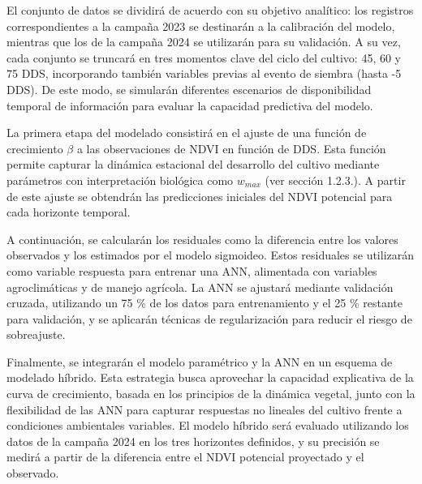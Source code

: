 \documentclass[
11pt, %
]{charter}
\begin{document}
El conjunto de datos se dividirá de acuerdo con su objetivo analítico: los registros correspondientes a la campaña 2023 se destinarán a la calibración del modelo, mientras que los de la campaña 2024 se utilizarán para su validación. A su vez, cada conjunto se truncará en tres momentos clave del ciclo del cultivo: 45, 60 y 75 DDS, incorporando también variables previas al evento de siembra (hasta -5 DDS). De este modo, se simularán diferentes escenarios de disponibilidad temporal de información para evaluar la capacidad predictiva del modelo.

La primera etapa del modelado consistirá en el ajuste de una función de crecimiento $\beta$ a las observaciones de NDVI en función de DDS. Esta función permite capturar la dinámica estacional del desarrollo del cultivo mediante parámetros con interpretación biológica como $w_{max}$ (ver sección 1.2.3.). A partir de este ajuste se obtendrán las predicciones iniciales del NDVI potencial para cada horizonte temporal.

A continuación, se calcularán los residuales como la diferencia entre los valores observados y los estimados por el modelo sigmoideo. Estos residuales se utilizarán como variable respuesta para entrenar una ANN, alimentada con variables agroclimáticas y de manejo agrícola. La ANN se ajustará mediante validación cruzada, utilizando un 75 \% de los datos para entrenamiento y el 25 \% restante para validación, y se aplicarán técnicas de regularización para reducir el riesgo de sobreajuste.

Finalmente, se integrarán el modelo paramétrico y la ANN en un esquema de modelado híbrido. Esta estrategia busca aprovechar la capacidad explicativa de la curva de crecimiento, basada en los principios de la dinámica vegetal, junto con la flexibilidad de las ANN para capturar respuestas no lineales del cultivo frente a condiciones ambientales variables. El modelo híbrido será evaluado utilizando los datos de la campaña 2024 en los tres horizontes definidos, y su precisión se medirá a partir de la diferencia entre el NDVI potencial proyectado y el observado.
\end{document}
